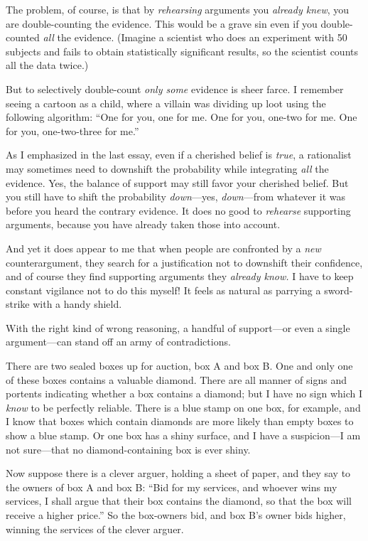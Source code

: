 {
 The problem, of course, is that by \textit{rehearsing} arguments
you \textit{already knew}, you are double-counting the evidence. This
would be a grave sin even if you double-counted \textit{all} the
evidence. (Imagine a scientist who does an experiment with 50 subjects
and fails to obtain statistically significant results, so the scientist
counts all the data twice.)}

{
 But to selectively double-count \textit{only some} evidence is
sheer farce. I remember seeing a cartoon as a child, where a villain
was dividing up loot using the following algorithm:
``One for you, one for me. One for you, one-two for
me. One for you, one-two-three for me.''}

{
 As I emphasized in the last essay, even if a cherished belief is
\textit{true}, a rationalist may sometimes need to downshift the
probability while integrating \textit{all} the evidence. Yes, the
balance of support may still favor your cherished belief. But you still
have to shift the probability \textit{down}{}---yes,
\textit{down}{}---from whatever it was before you heard the contrary
evidence. It does no good to \textit{rehearse} supporting arguments,
because you have already taken those into account.}

{
 And yet it does appear to me that when people are confronted by a
\textit{new} counterargument, they search for a justification not to
downshift their confidence, and of course they find supporting
arguments they \textit{already know.} I have to keep constant vigilance
not to do this myself! It feels as natural as parrying a sword-strike
with a handy shield.}

{
 With the right kind of wrong reasoning, a handful of support---or
even a single argument---can stand off an army of contradictions.}

\myendsectiontext


{
 There are two sealed boxes up for auction, box A and box B. One
and only one of these boxes contains a valuable diamond. There are all
manner of signs and portents indicating whether a box contains a
diamond; but I have no sign which I \textit{know} to be perfectly
reliable. There is a blue stamp on one box, for example, and I know
that boxes which contain diamonds are more likely than empty boxes to
show a blue stamp. Or one box has a shiny surface, and I have a
suspicion---I am not sure---that no diamond-containing box is ever
shiny. }

{
 Now suppose there is a clever arguer, holding a sheet of paper,
and they say to the owners of box A and box B: ``Bid
for my services, and whoever wins my services, I shall argue that their
box contains the diamond, so that the box will receive a higher
price.'' So the box-owners bid, and box
B's owner bids higher, winning the services of the
clever arguer.}

